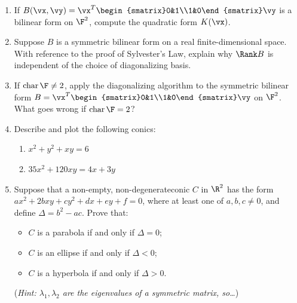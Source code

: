 \begin{exercises}
\begin{enumerate}
  \item If $B(\vx,\vy)=\vx^T\begin{smatrix}0&1\\1&0\end{smatrix}\vy$ is a bilinear form on $\F^2$, compute the quadratic form $K(\vx)$.
  
  \item Suppose $B$ is a symmetric bilinear form on a real finite-dimensional space. With reference to the proof of Sylvester's Law, explain why $\Rank B$ is independent of the choice of diagonalizing basis.
  
  \item If $\operatorname{char}\F\neq 2$, apply the diagonalizing algorithm to the symmetric bilinear form $B=\vx^T\begin{smatrix}0&1\\1&0\end{smatrix}\vy$ on $\F^2$. What goes wrong if $\operatorname{char}\F=2$? 
  
  \item Describe and plot the following conics:
  \begin{enumerate}
    \item $x^2+y^2+xy=6$
    
    \item $35x^2+120xy=4x+3y$
  \end{enumerate}
  
  \item Suppose that a non-empty, non-degenerate\footnotemark conic $C$ in $\R^2$ has the form $ax^2+2bxy+cy^2+dx+ey+f=0$, where at least one of $a,b,c\neq 0$, and define $\Delta=b^2-ac$. Prove that:
  \begin{itemize}
    \item $C$ is a parabola if and only if $\Delta=0$;
    \item $C$ is an ellipse if and only if $\Delta<0$;
    \item $C$ is a hyperbola if and only if $\Delta>0$.
  \end{itemize}
  (\emph{Hint: $\lambda_1,\lambda_2$ are the eigenvalues of a symmetric matrix, so\ldots})
  
\end{enumerate}
\end{exercises}

